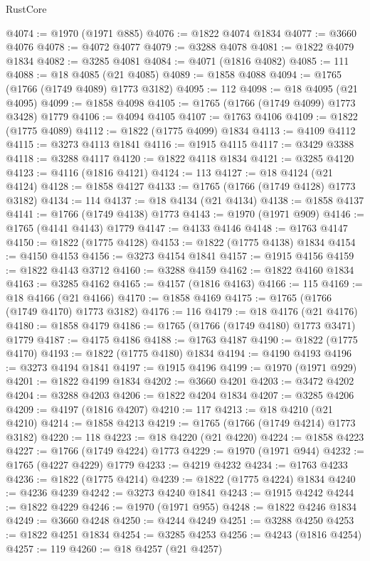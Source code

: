 \begin{lexlean}{RustCore}
\begin{coremodule}
@4074 := @1970 (@1971 @885)
@4076 := @1822 @4074 @1834
@4077 := @3660 @4076
@4078 := @4072 @4077
@4079 := @3288 @4078
@4081 := @1822 @4079 @1834
@4082 := @3285 @4081
@4084 := @4071 (@1816 @4082)
@4085 := 111
@4088 := @18 @4085 (@21 @4085)
@4089 := @1858 @4088
@4094 := @1765 (@1766 (@1749 @4089) @1773 @3182)
@4095 := 112
@4098 := @18 @4095 (@21 @4095)
@4099 := @1858 @4098
@4105 := @1765 (@1766 (@1749 @4099) @1773 @3428) @1779
@4106 := @4094 @4105
@4107 := @1763 @4106
@4109 := @1822 (@1775 @4089)
@4112 := @1822 (@1775 @4099) @1834
@4113 := @4109 @4112
@4115 := @3273 @4113 @1841
@4116 := @1915 @4115
@4117 := @3429 @3388
@4118 := @3288 @4117
@4120 := @1822 @4118 @1834
@4121 := @3285 @4120
@4123 := @4116 (@1816 @4121)
@4124 := 113
@4127 := @18 @4124 (@21 @4124)
@4128 := @1858 @4127
@4133 := @1765 (@1766 (@1749 @4128) @1773 @3182)
@4134 := 114
@4137 := @18 @4134 (@21 @4134)
@4138 := @1858 @4137
@4141 := @1766 (@1749 @4138) @1773
@4143 := @1970 (@1971 @909)
@4146 := @1765 (@4141 @4143) @1779
@4147 := @4133 @4146
@4148 := @1763 @4147
@4150 := @1822 (@1775 @4128)
@4153 := @1822 (@1775 @4138) @1834
@4154 := @4150 @4153
@4156 := @3273 @4154 @1841
@4157 := @1915 @4156
@4159 := @1822 @4143 @3712
@4160 := @3288 @4159
@4162 := @1822 @4160 @1834
@4163 := @3285 @4162
@4165 := @4157 (@1816 @4163)
@4166 := 115
@4169 := @18 @4166 (@21 @4166)
@4170 := @1858 @4169
@4175 := @1765 (@1766 (@1749 @4170) @1773 @3182)
@4176 := 116
@4179 := @18 @4176 (@21 @4176)
@4180 := @1858 @4179
@4186 := @1765 (@1766 (@1749 @4180) @1773 @3471) @1779
@4187 := @4175 @4186
@4188 := @1763 @4187
@4190 := @1822 (@1775 @4170)
@4193 := @1822 (@1775 @4180) @1834
@4194 := @4190 @4193
@4196 := @3273 @4194 @1841
@4197 := @1915 @4196
@4199 := @1970 (@1971 @929)
@4201 := @1822 @4199 @1834
@4202 := @3660 @4201
@4203 := @3472 @4202
@4204 := @3288 @4203
@4206 := @1822 @4204 @1834
@4207 := @3285 @4206
@4209 := @4197 (@1816 @4207)
@4210 := 117
@4213 := @18 @4210 (@21 @4210)
@4214 := @1858 @4213
@4219 := @1765 (@1766 (@1749 @4214) @1773 @3182)
@4220 := 118
@4223 := @18 @4220 (@21 @4220)
@4224 := @1858 @4223
@4227 := @1766 (@1749 @4224) @1773
@4229 := @1970 (@1971 @944)
@4232 := @1765 (@4227 @4229) @1779
@4233 := @4219 @4232
@4234 := @1763 @4233
@4236 := @1822 (@1775 @4214)
@4239 := @1822 (@1775 @4224) @1834
@4240 := @4236 @4239
@4242 := @3273 @4240 @1841
@4243 := @1915 @4242
@4244 := @1822 @4229
@4246 := @1970 (@1971 @955)
@4248 := @1822 @4246 @1834
@4249 := @3660 @4248
@4250 := @4244 @4249
@4251 := @3288 @4250
@4253 := @1822 @4251 @1834
@4254 := @3285 @4253
@4256 := @4243 (@1816 @4254)
@4257 := 119
@4260 := @18 @4257 (@21 @4257)

\end{coremodule}
\end{lexlean}
